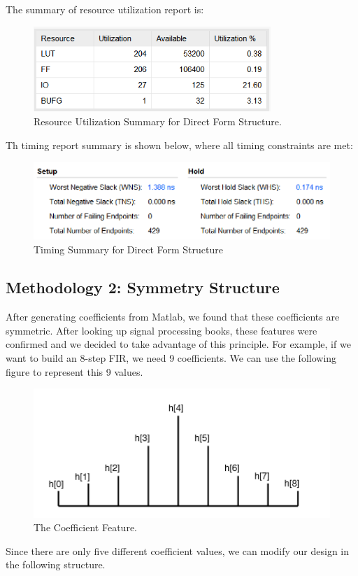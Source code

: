 \documentclass[a4paper]{article}
\begin{document}
The summary of resource utilization report is:
\begin{figure}[H]
    \centering
    \includegraphics[width=0.8\textwidth]{siyuan/Direct usage.png}
    \caption{Resource Utilization Summary for Direct Form Structure.}
\end{figure}
Th timing report summary is shown below, where all timing constraints are met:
\begin{figure}[H]
    \centering
    \includegraphics[width=1\textwidth]{siyuan/Direct timing.png}
    \caption{Timing Summary for Direct Form Structure}
\end{figure}
\subsection{Methodology 2: Symmetry Structure}

After generating coefficients from Matlab, we found that these coefficients are symmetric. After looking up signal processing books, these features were confirmed and we decided to take advantage of this principle. For example, if we want to build an 8-step FIR, we need 9 coefficients. We can use the following figure to represent this 9 values.
\begin{figure}[H]
    \centering
    \includegraphics[width=1\textwidth]{siyuan/Sym coefficient.png}
    \caption{The Coefficient Feature.}
\end{figure}
Since there are only five different coefficient values, we can modify our design in the following structure.
\end{document}
